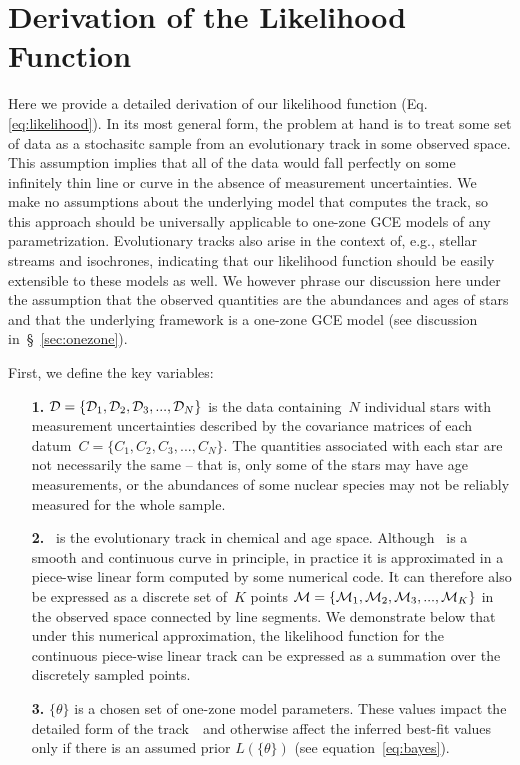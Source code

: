\documentclass[ms.tex]{subfiles}
\begin{document}
\renewcommand\theequation{\thesection\arabic{equation}}
\renewcommand\thefigure{\thesection\arabic{figure}}
\setcounter{equation}{0}
\setcounter{figure}{0}

\section{Derivation of the Likelihood Function}
\label{sec:likelihood}

Here we provide a detailed derivation of our likelihood function (Eq.
\ref{eq:likelihood}).
In its most general form, the problem at hand is to treat some set of data as a
stochasitc sample from an evolutionary track in some observed space.
This assumption implies that all of the data would fall perfectly on some
infinitely thin line or curve in the absence of measurement uncertainties.
We make no assumptions about the underlying model that computes the track, so
this approach should be universally applicable to one-zone GCE models of any
parametrization.
Evolutionary tracks also arise in the context of, e.g., stellar streams and
isochrones, indicating that our likelihood function should be easily extensible
to these models as well.
We however phrase our discussion here under the assumption that the observed
quantities are the abundances and ages of stars and that the underlying
framework is a one-zone GCE model (see discussion in~\S~\ref{sec:onezone}).
\par
First, we define the key variables:
\begin{itemize}

	\item[\textbf{1.}] $\mathcal{D} = \{\mathcal{D}_1, \mathcal{D}_2,
	\mathcal{D}_3, ..., \mathcal{D}_N\}$ is the data containing~$N$ individual
	stars with measurement uncertainties described by the covariance matrices
	of each datum~$C = \{C_1, C_2, C_3, ..., C_N\}$.
	The quantities associated with each star are not necessarily the same --
	that is, only some of the stars may have age measurements, or the
	abundances of some nuclear species may not be reliably measured for the
	whole sample.

	\item[\textbf{2.}] ~is the evolutionary track in chemical and age
	space.
	Although~ is a smooth and continuous curve in principle, in
	practice it is approximated in a piece-wise linear form computed by some
	numerical code.
	It can therefore also be expressed as a discrete set of~$K$ points
	$\mathcal{M} = \{\mathcal{M}_1, \mathcal{M}_2, \mathcal{M}_3, ...,
	\mathcal{M}_K\}$ in the observed space connected by line segments.
	We demonstrate below that under this numerical approximation, the
	likelihood function for the continuous piece-wise linear track can be
	expressed as a summation over the discretely sampled points.

	\item[\textbf{3.}] $\{\theta\}$ is a chosen set of one-zone model
	parameters.
	These values impact the detailed form of the track~~and otherwise
	affect the inferred best-fit values only if there is an assumed prior
	$L(\{\theta\})$ (see equation~\ref{eq:bayes}).

\end{itemize}
\end{document}
